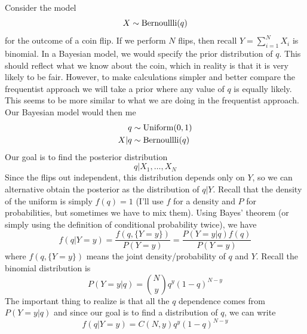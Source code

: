 Consider the model 
\begin{equation*}
X \sim {\rm Bernoullli}(q)
\end{equation*}
for the outcome of a coin flip. If we perform $N$ flips, then recall $Y = \sum_{i=1}^NX_i$ is binomial. 
In a Bayesian model, we would specify the prior distribution of $q$. This should reflect what we know about the coin, which in reality is that it is very likely to be fair. 
However, to make calculations simpler and better compare the frequentist approach we will take a prior where any value of $q$ is equally likely. This seems to be more similar to what we are doing in the frequentist approach. Our Bayesian model would then me
\begin{align*}
q &\sim {\rm Uniform}(0,1)\\
X|q &\sim {\rm Bernoullli}(q)
\end{align*}
Our goal is to find the posterior distribution 
\begin{equation*}
q|X_1,\dots,X_N
\end{equation*}
Since the flips out independent, this distribution depends only on $Y$, so we can alternative obtain the posterior as the distribution of $q|Y$. 
Recall that the density of the uniform is simply $f(q) = 1$ (I'll use $f$ for a density and $P$ for probabilities, but sometimes we have to mix them). Using Bayes' theorem (or simply using the definition of conditional probability twice), we have 
\begin{equation}
f(q|Y=y) = \frac{f(q,\{Y=y\})}{P(Y=y)} = \frac{P(Y=y|q)f(q)}{P(Y=y)} 
\end{equation}
where $f(q,\{Y=y\})$ means the joint density/probability of $q$ and $Y$. 
Recall the binomial distribution is 
\begin{equation}
P(Y=y|q) = {N \choose y}q^y(1-q)^{N-y}
\end{equation}
The important thing to realize is that all the $q$ dependence comes from $P(Y=y|q)$ and since our goal is to find a distribution of $q$, we can write
\begin{equation}
f(q|Y=y) = C(N,y)q^y(1-q)^{N-y}
\end{equation}
